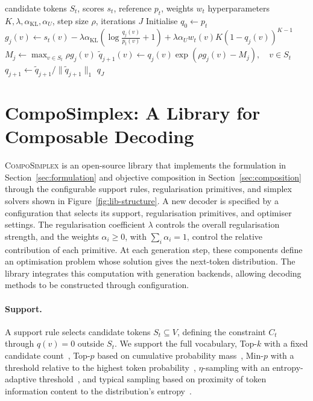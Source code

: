 \documentclass{article} %
\begin{document}
\begin{algorithm}[t]
\caption{BoK Decoder via Mirror Ascent (one decoding step)}
\label{alg:bok}
\begin{algorithmic}[1]
\Require candidate tokens $S_t$, scores $s_t$, reference $p_t$, weights $w_t$
\Require hyperparameters $K,\lambda,\alpha_{\mathrm{KL}},\alpha_U$, step size $\rho$, iterations $J$
\State Initialise $q_0 \gets p_t$
        \State $\displaystyle g_j(v) \gets s_t(v)
        -\lambda\alpha_{\mathrm{KL}}\!\left(\log\frac{q_j(v)}{p_t(v)}+1\right)
        +\lambda\alpha_U w_t(v)K(1-q_j(v))^{K-1}$
    \EndFor
    \State $M_j \gets \max_{v\in S_t}\rho g_j(v)$ 
    \State $\widetilde q_{j+1}(v)
    \gets q_j(v)\exp\!\left(\rho g_j(v)-M_j\right),\quad v\in S_t$
    \State $q_{j+1}
    \gets \widetilde q_{j+1}/\|\widetilde q_{j+1}\|_1$
\EndFor
\State \Return $q_J$
\end{algorithmic}
\end{algorithm}

\section{CompoSimplex: A Library for Composable Decoding}
\label{sec:library}
\textsc{CompoSimplex} is an open-source library that implements the formulation in Section~\ref{sec:formulation} and objective composition in Section~\ref{sec:composition} through the configurable support rules, regularisation primitives, and simplex solvers shown in Figure~\ref{fig:lib-structure}.
A new decoder is specified by a configuration that selects its support, regularisation primitives, and optimiser settings.
The regularisation coefficient $\lambda$ controls the overall regularisation strength, and the weights $\alpha_i \geq 0$, with $\sum_i \alpha_i = 1$, control the relative contribution of each primitive.
At each generation step, these components define an optimisation problem whose solution gives the next-token distribution. The library integrates this computation with generation backends, allowing decoding methods to be constructed through configuration.


\paragraph{Support.}
A support rule selects candidate tokens $S_t\subseteq V$,
defining the constraint $C_t$ through $q(v)=0$ outside $S_t$.
We support the full vocabulary,
Top-$k$ with a fixed candidate count~\citep{fan2018hierarchicalneuralstorygeneration},
Top-$p$ based on cumulative probability mass~\citep{holtzman2019curious},
Min-$p$ with a threshold relative to the highest token
probability~\citep{nguyen2025turning},
$\eta$-sampling with an entropy-adaptive threshold~\citep{hewitt2022truncation},
and typical sampling based on proximity of token information
content to the distribution's entropy~\citep{meister2023locally}.
\end{document}
